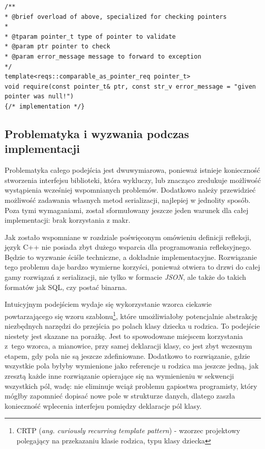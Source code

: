 \documentclass[12pt]{article}
\newcommand{\n}{\newline}
\begin{document}
{{{\begin{lstlisting}[frame=single]
/**
* @brief overload of above, specialized for checking pointers
*
* @tparam pointer_t type of pointer to validate
* @param ptr pointer to check
* @param error_message message to forward to exception
*/
template<reqs::comparable_as_pointer_req pointer_t>
void require(const pointer_t& ptr, const str_v error_message = "given pointer was null!")
{/* implementation */}
				\end{lstlisting}
			}
		}

		{
			\subsection{Problematyka i wyzwania podczas implementacji}

			Problematyka całego podejścia jest dwuwymiarowa, ponieważ istnieje konieczność stworzenia interfejsu biblioteki, która wykluczy, lub znacząco
			zredukuje możliwość wystąpienia wcześniej wspomnianych problemów. Dodatkowo należy przewidzieć możliwość zadawania własnych metod serializacji,
			najlepiej w jednolity sposób. Poza tymi wymaganiami, został sformułowany jeszcze jeden warunek dla całej implementacji: brak korzystania z makr.\n

			Jak zostało wspomniane w rozdziale poświęconym omówieniu definicji refleksji, język C++ nie posiada zbyt dużego wsparcia dla programowania
			refleksyjnego. Będzie to wyzwanie ściśle techniczne, a dokładnie implementacyjne. Rozwiązanie tego problemu daje bardzo wymierne korzyści,
			ponieważ otwiera to drzwi do całej gamy rozwiązań z serializacji, nie tylko w formacie {\it JSON}, ale także do takich formatów jak SQL, czy
			postać binarna.\n

			Intuicyjnym podejściem wydaje się wykorzystanie wzorca ciekawie powtarzającego się wzoru szablonu\footnote{
				CRTP ({\it ang. curiously recurring template pattern}) - wzorzec projektowy polegający na przekazaniu klasie rodzica, typu klasy dziecka\cite{crtp_definition}
			}, które umożliwiałoby potencjalnie abstrakcję niezbędnych narzędzi do przejścia po polach klasy dziecka u rodzica. To podejście niestety jest skazane na
			porażkę. Jest to spowodowane miejscem korzystania z~tego wzorca, a mianowice, przy samej deklaracji klasy, co jest zbyt wczesnym etapem, gdy pola nie są
			jeszcze zdefiniowane. Dodatkowo to rozwiązanie, gdzie wszystkie pola byłyby wymienione jako referencje u rodzica ma jeszcze jedną, jak zresztą każde
			inne rozwiązanie opierające się na wymienieniu w sekwencji wszystkich pól, wadę: nie eliminuje wciąż problemu gapiostwa programisty, który mógłby zapomnieć
			dopisać nowe pole w strukturze danych, dlatego zaszła konieczność wplecenia interfejsu pomiędzy deklaracje pól klasy.
		}

}
\end{document}
